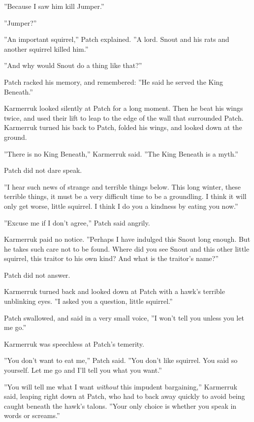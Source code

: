 \documentclass[11pt]{article}
\begin{document}
 ''Because I saw him kill Jumper.''\par
''Jumper?''\par
''An important squirrel,'' Patch explained. ''A lord. Snout and his rats and another squirrel killed him.''\par
 ''And why would Snout do a thing like that?''\par
 Patch racked his memory, and remembered: ''He said he served the King Beneath.''\par
 Karmerruk looked silently at Patch for a long moment. Then he beat his wings twice, and used their lift to leap to the edge of the wall that surrounded Patch. Karmerruk turned his back to Patch, folded his wings, and looked down at the ground.\par
 ''There is no King Beneath,'' Karmerruk said. ''The King Beneath is a myth.''\par
 Patch did not dare speak.\par
''I hear such news of strange and terrible things below. This long winter, these terrible things, it must be a very difficult time to be a groundling. I think it will only get worse, little squirrel. I think I do you a kindness by eating you now.''\par
''Excuse me if I don't agree,'' Patch said angrily.\par
Karmerruk paid no notice. ''Perhaps I have indulged this Snout long enough. But he takes such care not to be found. Where did you see Snout and this other little squirrel, this traitor to his own kind? And what is the traitor's name?''\par
Patch did not answer.\par
Karmerruk turned back and looked down at Patch with a hawk's terrible unblinking eyes. ''I asked you a question, little squirrel.''\par
Patch swallowed, and said in a very small voice, ''I won't tell you unless you let me go.''\par
Karmerruk was speechless at Patch's temerity.\par
''You don't want to eat me,'' Patch said. ''You don't like squirrel. You said so yourself. Let me go and I'll tell you what you want.''\par
''You will tell me what I want {\it without} this impudent bargaining,'' Karmerruk said, leaping right down at Patch, who had to back away quickly to avoid being caught beneath the hawk's talons. ''Your only choice is whether you speak in words or screams.''\par
\end{document}

